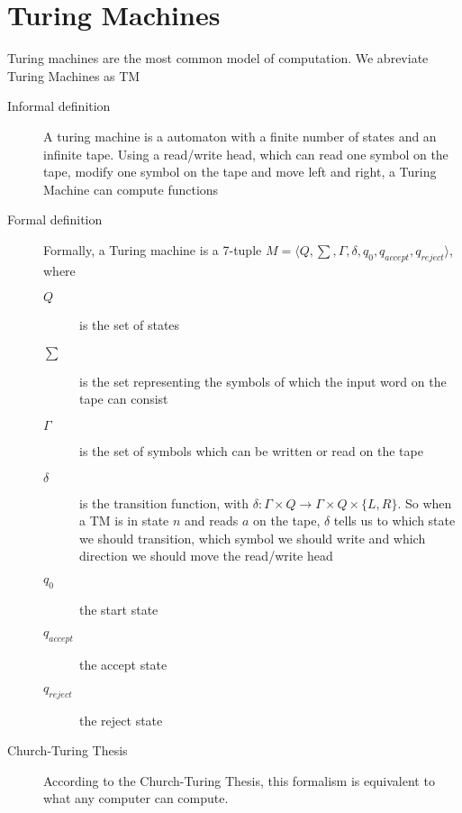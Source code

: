 \section{Turing Machines}\label{sec:turing-machines}
Turing machines are the most common model of computation. We abreviate Turing Machines as TM
\begin{description}
    \item[Informal definition] A turing machine is a automaton with a finite number of states and an infinite tape. Using a read/write head, which can read one symbol on the tape, modify one symbol on the tape and move left and right, a Turing Machine can compute functions
    \item[Formal definition] Formally, a Turing machine is a 7-tuple $M = \langle  Q, \sum, \Gamma, \delta, q_0, q_{accept}, q_{reject}\rangle$, where
    \begin{description}
        \item[$Q$] is the set of states
        \item[$\sum$] is the set representing the symbols of which the input word on the tape can consist
        \item[$\Gamma$] is the set of symbols which can be written or read on the tape
        \item[$\delta$] is the transition function, with $\delta : \Gamma \times Q \to \Gamma \times Q \times \{L, R\}$. So when a TM is in state $n$ and reads $a$ on the tape, $\delta$ tells us to which state we should transition, which symbol we should write and which direction we should move the read/write head
        \item[$q_0$] the start state
        \item[$q_{accept}$] the accept state
        \item[$q_{reject}$] the reject state
    \end{description}
    \item[Church-Turing Thesis] According to the Church-Turing Thesis, this formalism is equivalent to what any computer can compute.
\end{description}
